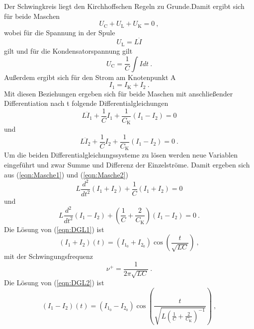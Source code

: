 Der Schwingkreis liegt den Kirchhoffschen Regeln zu Grunde.Damit ergibt sich für beide Maschen
\begin{equation}
	U_\text{C} + U_\text{L} + U_\text{K} = 0 \ ,
\end{equation}
wobei für die Spannung in der Spule
\begin{equation*}
	U_\text{L} = L \dot{I}
\end{equation*}
gilt und für die Kondensatorspannung gilt
\begin{equation*}
	U_\text{C} = \frac{1}{C} \int \! \! \! \! I dt \ .
\end{equation*}
Außerdem ergibt sich für den Strom am Knotenpunkt A
\begin{equation*}
	I_1 = I_\text{K} + I_2 \ .
\end{equation*}
Mit diesen Beziehungen ergeben sich für beide Maschen mit anschließender Differentiation nach t folgende Differentialgleichungen
\begin{equation}
	L \ddot{I}_1 + \frac{1}{C} I_1 + \frac{1}{C_\text{K}}(I_1 - I_2) = 0
	\label{eqn:Masche1}
\end{equation}
und
\begin{equation}
	L \ddot{I}_2 + \frac{1}{C} I_2 + \frac{1}{C_\text{K}}(I_1 - I_2) = 0 \ .
	\label{eqn:Masche2}
\end{equation}
Um die beiden Differentialgleichungssysteme zu lösen werden neue Variablen eingeführt und zwar Summe und Differenz der Einzelströme. Damit ergeben sich aus 	(\ref{eqn:Masche1}) und (\ref{eqn:Masche2})
\begin{equation}
	L \frac{d^2}{d t^2}(I_1 + I_2) + \frac{1}{C}(I_1 + I_2) = 0
	\label{eqn:DGL1}
\end{equation}
und
\begin{equation}
	L \frac{d^2}{d t^2}(I_1 - I_2) + \left(\frac{1}{C} + \frac{2}{C_\text{K}} \right)(I_1 - I_2) = 0 \ .
	\label{eqn:DGL2}
\end{equation}
Die Lösung von (\ref{eqn:DGL1}) ist
\begin{equation}
	(I_1 + I_2)(t) = (I_{1_0} + I_{2_0}) \cos \left(\frac{t}{\sqrt{LC}} \right) \ ,
\end{equation}
mit der Schwingungsfrequenz
\begin{equation}
	\nu^+ = \frac{1}{2 \pi \sqrt{LC}} \ .
	\label{eqn:vp}
\end{equation}
Die Lösung von (\ref{eqn:DGL2}) ist
\begin{equation}
	(I_1 - I_2)(t) = (I_{1_0} - I_{2_0}) \cos \left(\frac{t}{\sqrt{L \left(\frac{1}{C} + \frac{2}{C_\text{K}} \right)^{-1}}} \right) \ ,
\end{equation}
